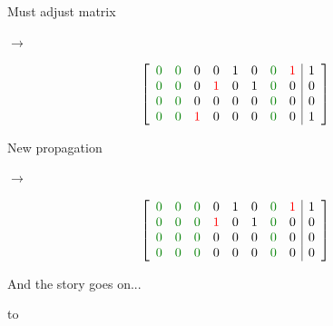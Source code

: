 \documentclass[aspectratio=196]{slides}
\def\TITLE#1{\hbox to \linewidth{\large #1\hfill}}
\def\BOTTOM{\vfill\newpage}
\def\SLIDE#1{\BOTTOM\TITLE{#1}}
\begin{document}
\begin{minipage}{0.2\linewidth}
\centering
Must adjust matrix

$\rightarrow$
\end{minipage}
\begin{minipage}{0.3\linewidth}
\[
\left[
\begin{array}{llllllll|l}
\color{darkgreen}0 & \color{darkgreen}0 &           0 &            0 & 1 & 0 & \color{darkgreen}0 & \color{red}1 & 1\\
\color{darkgreen}0 & \color{darkgreen}0 &           0 & \color{red}1 & 0 & 1 & \color{darkgreen}0 &            0 & 0\\
\color{darkgreen}0 & \color{darkgreen}0 &           0 &            0 & 0 & 0 & \color{darkgreen}0 &            0 & 0\\
\color{darkgreen}0 & \color{darkgreen}0 &\color{red}1 &            0 & 0 & 0 & \color{darkgreen}0 &            0 & 1\\
\end{array}
\right]
\]
\end{minipage}
\begin{minipage}{0.2\linewidth}
\centering
New propagation

$\rightarrow$
\end{minipage}
\begin{minipage}{0.3\linewidth}
\[
\left[
\begin{array}{llllllll|l}
\color{darkgreen}0 & \color{darkgreen}0 &\color{darkgreen}0 &            0 & 1 & 0 & \color{darkgreen}0 & \color{red}1 & 1\\
\color{darkgreen}0 & \color{darkgreen}0 &\color{darkgreen}0 & \color{red}1 & 0 & 1 & \color{darkgreen}0 &            0 & 0\\
\color{darkgreen}0 & \color{darkgreen}0 &\color{darkgreen}0 &            0 & 0 & 0 & \color{darkgreen}0 &            0 & 0\\
\color{darkgreen}0 & \color{darkgreen}0 &\color{darkgreen}0 &            0 & 0 & 0 & \color{darkgreen}0 &            0 & 0\\
\end{array}
\right]
\]
\end{minipage}

And the story goes on...

\vfill
\newpage
\SLIDE{CDCL(T) Gauss-Jordan Elimination: Reason Clauses}
\vspace{2ex}
\end{document}
